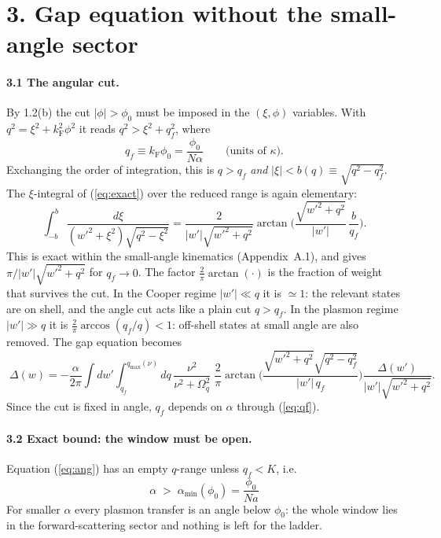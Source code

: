 \documentclass[11pt]{article}
\newcommand{\kF}{k_{\mathrm F}}
\begin{document}
\section*{3. Gap equation without the small-angle sector}

\paragraph{3.1 The angular cut.}
By 1.2(b) the cut $|\phi|>\phi_0$ must be imposed in the $(\xi,\phi)$ variables. With
$q^2=\xi^2+\kF^2\phi^2$ it reads $q^2>\xi^2+q_f^2$, where
\begin{equation}
q_f\equiv\kF\phi_0=\frac{\phi_0}{N\alpha}\qquad\text{(units of $\kappa$)} .
\label{eq:qf}
\end{equation}
Exchanging the order of integration, this is $q>q_f$ \emph{and} $|\xi|<b(q)\equiv\sqrt{q^2-q_f^2}$.
The $\xi$-integral of (\ref{eq:exact}) over the reduced range is again elementary:
\begin{equation}
\int_{-b}^{b}\frac{d\xi}{(w'^2+\xi^2)\sqrt{q^2-\xi^2}}
=\frac{2}{|w'|\sqrt{w'^2+q^2}}\arctan\!\Big(\frac{\sqrt{w'^2+q^2}}{|w'|}\,\frac{b}{q_f}\Big).
\label{eq:arctan}
\end{equation}
This is exact within the small-angle kinematics (Appendix~A.1), and gives $\pi/|w'|\sqrt{w'^2+q^2}$
for $q_f\to0$. The factor $\frac2\pi\arctan(\cdot)$ is the fraction of weight that survives
the cut. In the Cooper regime $|w'|\ll q$ it is $\simeq1$: the relevant states are on shell,
and the angle cut acts like a plain cut $q>q_f$. In the plasmon regime $|w'|\gg q$ it is
$\frac2\pi\arccos(q_f/q)<1$: off-shell states at small angle are also removed. The gap equation
becomes
\begin{equation}
\boxed{\;\Delta(w)=-\frac{\alpha}{2\pi}\int dw'\int_{q_f}^{q_{\max}(\nu)}\!dq\,
\frac{\nu^2}{\nu^2+\Omega_q^2}\;
\frac{2}{\pi}\arctan\!\Big(\frac{\sqrt{w'^2+q^2}\sqrt{q^2-q_f^2}}{|w'|\,q_f}\Big)
\frac{\Delta(w')}{|w'|\sqrt{w'^2+q^2}}.\;}
\label{eq:ang}
\end{equation}
Since the cut is fixed in angle, $q_f$ depends on $\alpha$ through (\ref{eq:qf}).

\paragraph{3.2 Exact bound: the window must be open.}
Equation (\ref{eq:ang}) has an empty $q$-range unless $q_f<K$, i.e.
\begin{equation}
\boxed{\;\alpha\;>\;\alpha_{\min}(\phi_0)=\frac{\phi_0}{Na}\;}
\label{eq:bound}
\end{equation}
For smaller $\alpha$ every plasmon transfer is an angle below $\phi_0$: the whole window
lies in the forward-scattering sector and nothing is left for the ladder.
\end{document}
